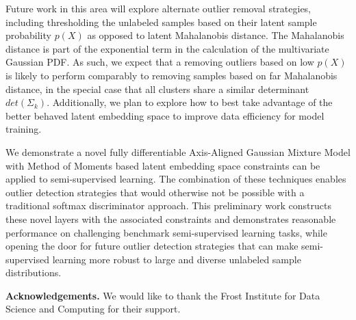 \documentclass[10pt,twocolumn,letterpaper]{article}
\begin{document}



Future work in this area will explore alternate outlier removal strategies, including thresholding the unlabeled samples based on their latent sample probability $p(X)$ as opposed to latent Mahalanobis distance.  
The Mahalanobis distance is part of the exponential term in the calculation of the multivariate Gaussian PDF. 
As such, we expect that a removing outliers based on low $p(X)$ is likely to perform comparably to removing samples based on far Mahalanobis distance, in the special case that all clusters share a similar determinant $det\left(\Sigma_k \right)$.  
Additionally, we plan to explore how to best take advantage of the better behaved latent embedding space to improve data efficiency for model training. 

We demonstrate a novel fully differentiable Axis-Aligned Gaussian Mixture Model with Method of Moments based latent embedding space constraints can be applied to semi-supervised learning.  
The combination of these techniques enables outlier detection strategies that would otherwise not be possible with a traditional softmax discriminator approach.
This preliminary work constructs these novel layers with the associated constraints and demonstrates reasonable performance on challenging benchmark semi-supervised learning tasks, while opening the door for future outlier detection strategies that can make semi-supervised learning more robust to large and diverse unlabeled sample distributions.

\textbf{Acknowledgements.} We would like to thank the Frost Institute for Data Science and Computing for their support.



{
	\small
	
	
}
\end{document}
